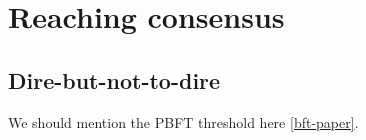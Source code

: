 \chapter{Reaching consensus}
\label{testing:consensus}

\section{Dire-but-not-to-dire}
\label{testing:dire}

We should mention the PBFT threshold here \cref{bft-paper}.
